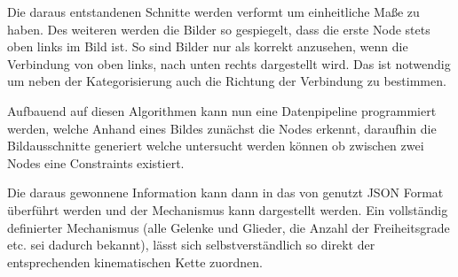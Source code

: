 Die daraus entstandenen Schnitte werden verformt um einheitliche Maße zu haben.
Des weiteren werden die Bilder so gespiegelt, dass die erste Node stets oben links im Bild ist.
So sind Bilder nur als korrekt anzusehen, wenn die Verbindung von oben links, nach unten rechts dargestellt wird.
Das ist notwendig um neben der Kategorisierung auch die Richtung der Verbindung zu bestimmen.

Aufbauend auf diesen Algorithmen kann nun eine Datenpipeline programmiert werden, welche Anhand eines Bildes zunächst die Nodes erkennt, daraufhin die Bildausschnitte generiert welche untersucht werden können ob zwischen zwei Nodes eine Constraints existiert.

Die daraus gewonnene Information kann dann in das von  genutzt JSON Format überführt werden und der Mechanismus kann dargestellt werden.
Ein vollständig definierter Mechanismus (alle Gelenke und Glieder, die Anzahl der Freiheitsgrade etc. sei dadurch bekannt), lässt sich selbstverständlich so direkt der entsprechenden kinematischen Kette zuordnen.
